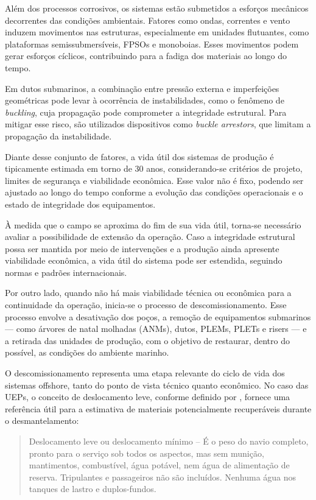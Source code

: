 \documentclass[a4paper,12pt]{article}
\begin{document}
Além dos processos corrosivos, os sistemas estão submetidos a esforços mecânicos decorrentes das condições ambientais. Fatores como ondas, correntes e vento induzem movimentos nas estruturas, especialmente em unidades flutuantes, como plataformas semissubmersíveis, FPSOs e monoboias. Esses movimentos podem gerar esforços cíclicos, contribuindo para a fadiga dos materiais ao longo do tempo.

Em dutos submarinos, a combinação entre pressão externa e imperfeições geométricas pode levar à ocorrência de instabilidades, como o fenômeno de \textit{buckling}, cuja propagação pode comprometer a integridade estrutural. Para mitigar esse risco, são utilizados dispositivos como \textit{buckle arrestors}, que limitam a propagação da instabilidade.

Diante desse conjunto de fatores, a vida útil dos sistemas de produção é tipicamente estimada em torno de 30 anos, considerando-se critérios de projeto, limites de segurança e viabilidade econômica. Esse valor não é fixo, podendo ser ajustado ao longo do tempo conforme a evolução das condições operacionais e o estado de integridade dos equipamentos.

À medida que o campo se aproxima do fim de sua vida útil, torna-se necessário avaliar a possibilidade de extensão da operação. Caso a integridade estrutural possa ser mantida por meio de intervenções e a produção ainda apresente viabilidade econômica, a vida útil do sistema pode ser estendida, seguindo normas e padrões internacionais.

Por outro lado, quando não há mais viabilidade técnica ou econômica para a continuidade da operação, inicia-se o processo de descomissionamento. Esse processo envolve a desativação dos poços, a remoção de equipamentos submarinos — como árvores de natal molhadas (ANMs), dutos, PLEMs, PLETs e risers — e a retirada das unidades de produção, com o objetivo de restaurar, dentro do possível, as condições do ambiente marinho.

O descomissionamento representa uma etapa relevante do ciclo de vida dos sistemas offshore, tanto do ponto de vista técnico quanto econômico. No caso das UEPs, o conceito de deslocamento leve, conforme definido por \textcite{fonseca2002artenaval}, fornece uma referência útil para a estimativa de materiais potencialmente recuperáveis durante o desmantelamento:
  
\begin{quotation}
Deslocamento leve ou deslocamento mínimo -- É o peso do navio completo, pronto para o serviço sob todos os aspectos, mas sem munição, mantimentos, combustível, água potável, nem água de alimentação de reserva. Tripulantes e passageiros não são incluídos. Nenhuma água nos tanques de lastro e duplos-fundos.
\end{quotation}
\end{document}
